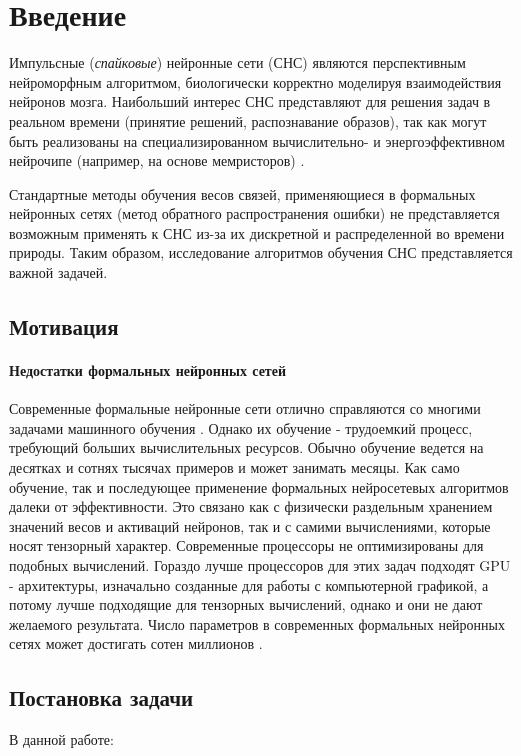\documentclass[a4paper]{article}
\begin{document}
\thispagestyle{empty}

\tableofcontents

\clearpage

\section{Введение}
Импульсные (\textit{спайковые}) нейронные сети (СНС) являются перспективным нейроморфным алгоритмом, биологически корректно моделируя взаимодействия нейронов мозга. Наибольший интерес СНС представляют для решения задач в реальном времени (принятие решений, распознавание образов), так как могут быть реализованы на специализированном вычислительно- и энергоэффективном нейрочипе (например, на основе мемристоров) \cite{hardware1} \cite{hardware2}.

Стандартные методы обучения весов связей, применяющиеся в формальных нейронных сетях (метод обратного распространения ошибки) не представляется возможным применять к СНС из-за их дискретной и распределенной во времени природы. Таким образом, исследование алгоритмов обучения СНС представляется важной задачей.

\subsection{Мотивация}
\paragraph{Недостатки формальных нейронных сетей}
Современные формальные нейронные сети отлично справляются со многими задачами машинного обучения \cite{pmlr-v28-wan13}. Однако их обучение - трудоемкий процесс, требующий больших вычислительных ресурсов. Обычно обучение ведется на десятках и сотнях тысячах примеров и может занимать месяцы. Как само обучение, так и последующее применение формальных нейросетевых алгоритмов далеки от эффективности. Это связано как с физически раздельным хранением значений весов и активаций нейронов, так и с самими вычислениями, которые носят тензорный характер. Современные процессоры не оптимизированы для подобных вычислений. Гораздо лучше процессоров для этих задач подходят GPU - архитектуры, изначально созданные для работы с компьютерной графикой, а потому лучше подходящие для тензорных вычислений, однако и они не дают желаемого результата. Число параметров в современных формальных нейронных сетях может достигать сотен миллионов \cite{ManyParams}.

\subsection{Постановка задачи}
В данной работе:
\end{document}

